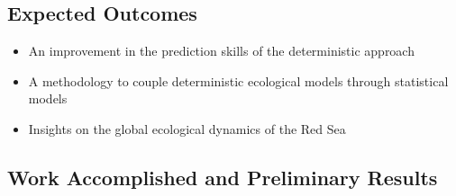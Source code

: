 \subsection{Expected Outcomes}

\begin{itemize}
\item An improvement in the prediction skills of the deterministic approach
\item A methodology to couple deterministic ecological models through statistical models
\item Insights on the global ecological dynamics of the Red Sea
\end{itemize}

\subsection{Work Accomplished and Preliminary Results}


